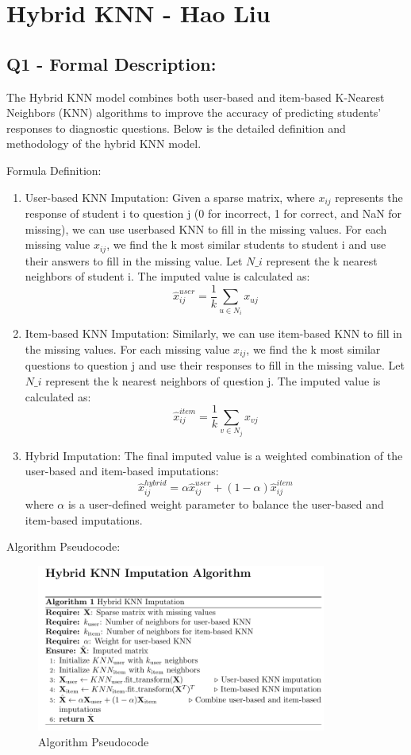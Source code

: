 \documentclass{article}
\begin{document}
\section*{Hybrid KNN - Hao Liu}
\subsection*{Q1 - Formal Description:}
The Hybrid KNN model combines both user-based and item-based K-Nearest Neighbors (KNN) algorithms to improve the accuracy of predicting students' responses to diagnostic questions. Below is the detailed definition and methodology of the hybrid KNN model.

Formula Definition:
\begin{enumerate}
    \item User-based KNN Imputation:\newline
    Given a sparse matrix, where $x_{ij}$ represents the response of student i to question j (0 for incorrect, 1 for correct, and NaN for missing), we can use user\-based KNN to fill in the missing values. For each missing value $x_{ij}$, we find the k most similar students to student i and use their answers to fill in the missing value.
    Let $N\_i$ represent the k nearest neighbors of student i. The imputed value is calculated as:
    \[\hat{x}_{ij}^{user} = \frac{1}{k} \sum_{u \in N_i} x_{uj}\]
    \item Item-based KNN Imputation:\newline
    Similarly, we can use item-based KNN to fill in the missing values. For each missing value $x_{ij}$, we find the k most similar questions to question j and use their responses to fill in the missing value.
    Let $N\_i$ represent the k nearest neighbors of question j. The imputed value is calculated as:
    \[\hat{x}_{ij}^{item} = \frac{1}{k} \sum_{v \in N_j} x_{vj}\]
    \item Hybrid Imputation:\newline
    The final imputed value is a weighted combination of the user-based and item-based imputations:
    \[\hat{x}_{ij}^{hybrid} = \alpha\hat{x}_{ij}^{user} + (1-\alpha)\hat{x}_{ij}^{item}\]
    where $\alpha$ is a user-defined weight parameter to balance the user-based and item-based imputations.
\end{enumerate}
\newpage 

Algorithm Pseudocode:
\begin{figure}[H]
    \centering
    \includegraphics[width=0.85\textwidth]{bl1.png}
    \caption{Algorithm Pseudocode}
\end{figure}
\end{document}
